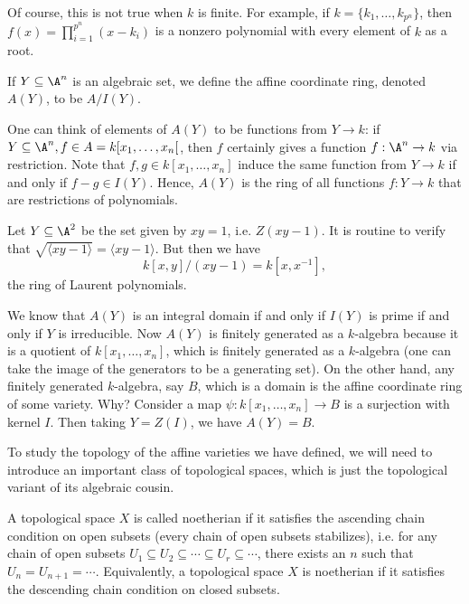 Of course, this is not true  when $k$ is finite. For example, if $k= \{ k_1,\ldots,k_{p^n} \}$, then $f(x)= \prod_{i=1}^{p^n} (x-k_i)$ is a nonzero polynomial with every element of $k$ as a root. 


\begin{dfn}
If $Y \subseteq \A^n$ is an algebraic set, we define the affine coordinate ring, denoted $A(Y)$, to be $A/I(Y)$. 
\end{dfn}


One can think of elements of $A(Y)$ to be functions from $Y \to k$: if $Y \subseteq \A^n, f \in A=k[x_1,\ldots,x_n[$, then $f$ certainly gives a function $f: \A^n \to k$ via restriction. Note that $f,g \in k[x_1,\ldots,x_n]$ induce the same function from $Y \to k$ if and only if $f-g \in I(Y)$. Hence, $A(Y)$ is the ring of all functions $f: Y \to k$ that are restrictions of polynomials. 


\begin{ex}
Let $Y \subseteq \A^2$ be the set given by $xy=1$, i.e. $Z(xy - 1)$. It is routine to verify that $\sqrt{\langle xy - 1 \rangle}= \langle xy - 1 \rangle$. But then we have
	\[
	k[x,y]/(xy - 1)= k[x,x^{-1}],
	\]
the ring of Laurent polynomials. \xqed
\end{ex}


\begin{rem}
We know that $A(Y)$ is an integral domain if and only if $I(Y)$ is prime if and only if $Y$ is irreducible. Now $A(Y)$ is finitely generated as a $k$-algebra because it is a quotient of $k[x_1,\ldots,x_n]$, which is finitely generated as a $k$-algebra (one can take the image of the generators to be a generating set). On the other hand, any finitely generated $k$-algebra, say $B$, which is a domain is the affine coordinate ring of some variety. Why? Consider a map $\psi: k[x_1,\ldots,x_n] \to B$ is a surjection with kernel $I$. Then taking $Y= Z(I)$, we have $A(Y) = B$. 
\end{rem}


To study the topology of the affine varieties we have defined, we will need to introduce an important class of topological spaces, which is just the topological variant of its algebraic cousin.


\begin{dfn}[Noetherian]
A topological space $X$ is called noetherian if it satisfies the ascending chain condition on open subsets (every chain of open subsets stabilizes), i.e. for any chain of open subsets $U_1 \subseteq U_2 \subseteq \cdots \subseteq U_r \subseteq \cdots$, there exists an $n$ such that $U_n=U_{n+1}=\cdots$. Equivalently, a topological space $X$ is noetherian if it satisfies the descending chain condition on closed subsets. 
\end{dfn}


